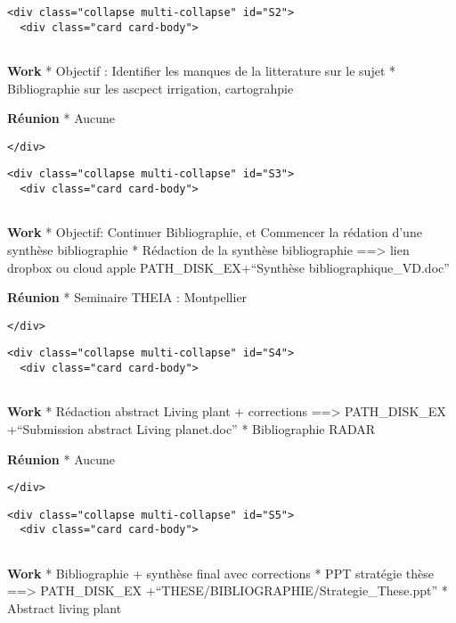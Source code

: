 \documentclass[11pt]{article}
\begin{document}
\begin{verbatim}
<div class="collapse multi-collapse" id="S2">
  <div class="card card-body">
      
\end{verbatim}

\textbf{Work} * Objectif : Identifier les manques de la litterature sur
le sujet * Bibliographie sur les ascpect irrigation, cartograhpie

\textbf{Réunion} * Aucune

\begin{verbatim}
</div>
\end{verbatim}

\begin{verbatim}
<div class="collapse multi-collapse" id="S3">
  <div class="card card-body">
      
\end{verbatim}

\textbf{Work} * Objectif: Continuer Bibliographie, et Commencer la
rédation d'une synthèse bibliographie * Rédaction de la synthèse
bibliographie ==\textgreater{} lien dropbox ou cloud apple
PATH\_DISK\_EX+``Synthèse bibliographique\_VD.doc''

\textbf{Réunion} * Seminaire THEIA : Montpellier

\begin{verbatim}
</div>
\end{verbatim}

\begin{verbatim}
<div class="collapse multi-collapse" id="S4">
  <div class="card card-body">
      
\end{verbatim}

\textbf{Work} * Rédaction abstract Living plant + corrections
==\textgreater{} PATH\_DISK\_EX +``Submission abstract Living
planet.doc'' * Bibliographie RADAR

\textbf{Réunion} * Aucune

\begin{verbatim}
</div>
\end{verbatim}

\begin{verbatim}
<div class="collapse multi-collapse" id="S5">
  <div class="card card-body">
     
\end{verbatim}

\textbf{Work} * Bibliographie + synthèse final avec corrections * PPT
stratégie thèse ==\textgreater{} PATH\_DISK\_EX
+``THESE/BIBLIOGRAPHIE/Strategie\_These.ppt'' * Abstract living plant
\end{document}
